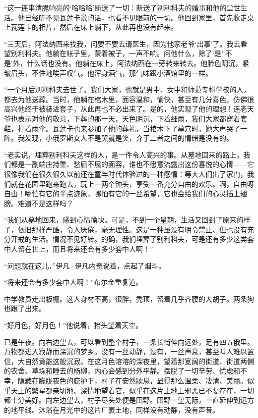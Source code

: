 \documentclass[12pt,UTF-8,openany]{ctexbook}
\begin{document}
\begin{large}
    “这一连串清脆响亮的‘哈哈哈’断送了一切：断送了别利科夫的婚事和他的尘世生活。他已经听不见瓦莲卡说的话，也看不见眼前的一切。他回到家里，首先收走桌上瓦莲卡的相片，然后在床上躺下，从此再也没有起来。
    
    “三天后，阿法纳西来找我，问要不要去请医生，因为他家老爷‘出事’了。我去看望别利科夫。他躺在帐子里，蒙着被子，一声不响。问他什么，除了‘是’‘不是’外，什么话也没有。他躺在床上，阿法纳西在一旁转来转去。他脸色阴沉，紧皱眉头，不住地唉声叹气。他浑身酒气，那气味跟小酒馆里的一样。
    
    “一个月后别利科夫去世了。我们大家，也就是男中、女中和师范专科学校的人，都去为他送葬。当时，他躺在棺木里，面容温和，愉快，甚至有几分喜色，仿佛很高兴他终于被装进套子，从此再也不必出来了。是的，他实现了他的理想！连老天爷也表示对他的敬意，下葬的那一天，天色阴沉，下着细雨，我们大家都穿着套鞋，打着雨伞。瓦莲卡也来参加了他的葬礼，当棺木下了墓穴时，她大声哭了一阵。我发现，小俄罗斯女人不是哭就是笑，介于二者之间的情绪是没有的。
    
    “老实说，埋葬别利科夫这样的人，是一件令人高兴的事。从墓地回来的路上，我们都是一副端庄持重、愁眉不展的面容，谁也不愿意流露出这份喜悦的心情——它很像我们在很久很久以前还在童年时代体验过的一种感情：等大人们出了家门，我们就在花园里跑来跑去，玩上一两个钟头，享受一番充分自由的欢乐。啊，自由呀自由！哪怕有它的半点迹象，哪怕有它的一丝希望，它也会给我们的心灵插上翅膀。难道不是这样吗？
    
    “我们从墓地回来，感到心情愉快。可是，不到一个星期，生活又回到了原来的样子，依旧那样严酷，令人厌倦，毫无理性。这是一种虽没有明令禁止、但也没有充分开戒的生活。情况不见好转。的确，我们埋葬了别利科夫，可是还有多少这类套中人留在世上，而且将来还会有多少套中人啊！”
    
    “问题就在这儿，”伊凡·伊凡内奇说着，点起了烟斗。
    
    “将来还会有多少套中人啊！”布尔金重复道。
    
    中学教员走出板棚。这人身材不高，很胖，秃顶，留着几乎齐腰的大胡子。两条狗也跟了出来。
    
    “好月色，好月色！”他说着，抬头望着天空。
    
    已是午夜。向右边望去，可以看到整个村子，一条长街伸向远处，足有四五俄里。万物都进入寂静而深沉的梦乡。没有一丝动静，没有，一丝声息，甚至叫人难以置信，大自然竟能这般沉寂。在这月色溶溶的深夜里，望着那宽阔的街道、街道两侧的农舍、草垛和睡去的杨柳，内心会感到分外平静。摆脱了一切辛劳、忧虑和不幸，隐藏在朦胧夜色的庇护下，村子在安然歇息，显得那么温柔、凄清、美丽。似乎天上的繁星都亲切地、深情地望着它，似乎在这片土地上邪恶已不复存在，一切都十分美好。向左边望去，村子尽头处便是田野。田野一望无际，一直延伸到远方的地平线。沐浴在月光中的这片广袤土地，同样没有动静，没有声音。
    

\end{large}
\end{document}
